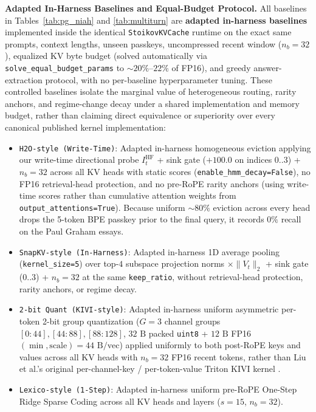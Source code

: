 \documentclass[conference]{IEEEtran}
\begin{document}
\textbf{Adapted In-Harness Baselines and Equal-Budget Protocol.} All baselines in Tables~\ref{tab:pg_niah} and \ref{tab:multiturn} are \textbf{adapted in-harness baselines} implemented inside the identical \texttt{StoikovKVCache} runtime on the exact same prompts, context lengths, unseen passkeys, uncompressed recent window ($n_b = 32$), equalized KV byte budget (solved automatically via \texttt{solve\_equal\_budget\_params} to $\sim 20\%$--$22\%$ of FP16), and greedy answer-extraction protocol, with no per-baseline hyperparameter tuning. These controlled baselines isolate the marginal value of heterogeneous routing, rarity anchors, and regime-change decay under a shared implementation and memory budget, rather than claiming direct equivalence or superiority over every canonical published kernel implementation:
\begin{itemize}
    \item \texttt{H2O-style (Write-Time)}: Adapted in-harness homogeneous eviction applying our write-time directional probe $I_t^{\text{HF}}$ + sink gate ($+100.0$ on indices $0..3$) + $n_b = 32$ across all KV heads with static scores (\texttt{enable\_hmm\_decay=False}), no FP16 retrieval-head protection, and no pre-RoPE rarity anchors (using write-time scores rather than cumulative attention weights from \texttt{output\_attentions=True}). Because uniform $\sim 80\%$ eviction across every head drops the 5-token BPE passkey prior to the final query, it records $0\%$ recall on the Paul Graham essays.
    \item \texttt{SnapKV-style (In-Harness)}: Adapted in-harness 1D average pooling (\texttt{kernel\_size=5}) over top-$4$ subspace projection norms $\times \|V_t\|_2$ + sink gate ($0..3$) + $n_b = 32$ at the same \texttt{keep\_ratio}, without retrieval-head protection, rarity anchors, or regime decay.
    \item \texttt{2-bit Quant (KIVI-style)}: Adapted in-harness uniform asymmetric per-token 2-bit group quantization ($G = 3$ channel groups $[0{:}44], [44{:}88], [88{:}128]$, $32\text{ B}$ packed \texttt{uint8} + $12\text{ B}$ FP16 $(\min, \text{scale}) = 44\text{ B/vec}$) applied uniformly to both post-RoPE keys and values across all KV heads with $n_b = 32$ FP16 recent tokens, rather than Liu et al.'s original per-channel-key / per-token-value Triton KIVI kernel \cite{b6}.
    \item \texttt{Lexico-style (1-Step)}: Adapted in-harness uniform pre-RoPE One-Step Ridge Sparse Coding across all KV heads and layers ($s = 15$, $n_b = 32$).
\end{itemize}
\end{document}
